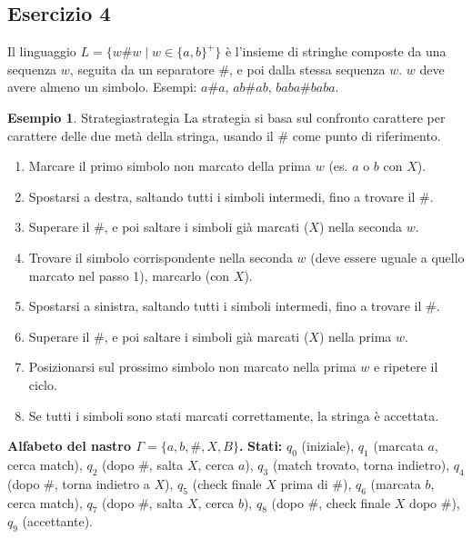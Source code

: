 \documentclass[a4paper]{article}
\theoremstyle{definition} %
\newtheorem{example}{Esempio}
\begin{document}
\subsection{Esercizio 4}
Il linguaggio $L = \{w\#w \mid w \in \{a,b\}^+\}$ è l'insieme di stringhe composte da una sequenza $w$, seguita da un separatore $\#$, e poi dalla stessa sequenza $w$. $w$ deve avere almeno un simbolo. Esempi: $a\#a$, $ab\#ab$, $baba\#baba$.

\begin{example}{Strategia}{strategia}
La strategia si basa sul confronto carattere per carattere delle due metà della stringa, usando il $\#$ come punto di riferimento.
\begin{enumerate}
    \item Marcare il primo simbolo non marcato della prima $w$ (es. $a$ o $b$ con $X$).
    \item Spostarsi a destra, saltando tutti i simboli intermedi, fino a trovare il $\#$.
    \item Superare il $\#$, e poi saltare i simboli già marcati ($X$) nella seconda $w$.
    \item Trovare il simbolo corrispondente nella seconda $w$ (deve essere uguale a quello marcato nel passo 1), marcarlo (con $X$).
    \item Spostarsi a sinistra, saltando tutti i simboli intermedi, fino a trovare il $\#$.
    \item Superare il $\#$, e poi saltare i simboli già marcati ($X$) nella prima $w$.
    \item Posizionarsi sul prossimo simbolo non marcato nella prima $w$ e ripetere il ciclo.
    \item Se tutti i simboli sono stati marcati correttamente, la stringa è accettata.
\end{enumerate}
\end{example}

\noindent \textbf{Alfabeto del nastro $\Gamma = \{a, b, \#, X, B\}$.}
\noindent \textbf{Stati:} $q_0$ (iniziale), $q_1$ (marcata $a$, cerca match), $q_2$ (dopo $\#$, salta $X$, cerca $a$), $q_3$ (match trovato, torna indietro), $q_4$ (dopo $\#$, torna indietro a $X$), $q_5$ (check finale $X$ prima di $\#$), $q_6$ (marcata $b$, cerca match), $q_7$ (dopo $\#$, salta $X$, cerca $b$), $q_8$ (dopo $\#$, check finale $X$ dopo $\#$), $q_9$ (accettante).
\end{document}
